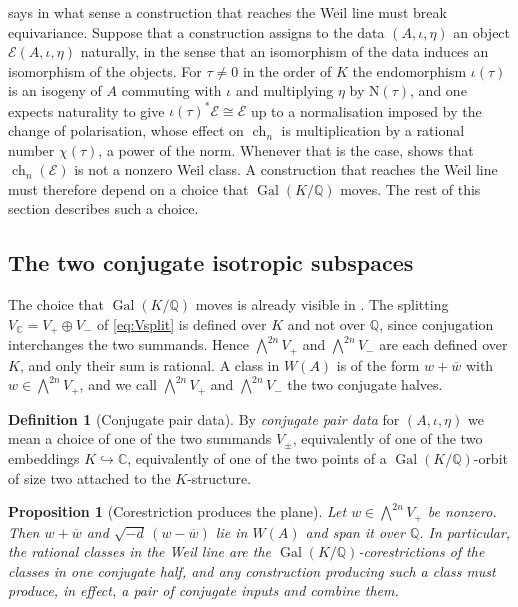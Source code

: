 \documentclass[11pt,reqno]{amsart}
\theoremstyle{plain}
\newtheorem{proposition}[theorem]{Proposition}
\theoremstyle{definition}
\newtheorem{definition}[theorem]{Definition}
\theoremstyle{remark}
\newcommand{\QQ}{\mathbb{Q}}
\newcommand{\CC}{\mathbb{C}}
\newcommand{\cE}{\mathcal{E}}
\newcommand{\HW}{W}                      %
\newcommand{\Nm}{\mathrm{N}}             %
\DeclareMathOperator{\ch}{ch}
\DeclareMathOperator{\Gal}{Gal}
\newcommand{\bbar}[1]{\overline{#1}}
\begin{document}
 says in what sense a construction that reaches the
Weil line must break equivariance. Suppose that a construction assigns to the data
$(A,\iota,\eta)$ an object $\cE(A,\iota,\eta)$ naturally, in the sense that
an isomorphism of the data induces an isomorphism of the objects. For
$\tau\ne0$ in the order of $K$ the endomorphism $\iota(\tau)$ is an isogeny of
$A$ commuting with $\iota$ and multiplying $\eta$ by $\Nm(\tau)$, and one
expects naturality to give $\iota(\tau)^{*}\cE\cong\cE$ up to a
normalisation imposed by the change of polarisation, whose effect on
$\ch_{n}$ is multiplication by a rational number $\chi(\tau)$, a power of the
norm. Whenever that is the case,  shows that
$\ch_{n}(\cE)$ is not a nonzero Weil class. A construction that reaches the
Weil line must therefore depend on a choice that $\Gal(K/\QQ)$ moves. The rest
of this section describes such a choice.

\subsection{The two conjugate isotropic subspaces}

The choice that $\Gal(K/\QQ)$ moves is already visible in
. The splitting
$V_{\CC}=V_{+}\oplus V_{-}$ of \eqref{eq:Vsplit} is defined over $K$ and not
over $\QQ$, since conjugation interchanges the two summands. Hence
$\bigwedge^{2n}V_{+}$ and $\bigwedge^{2n}V_{-}$ are each defined over $K$,
and only their sum is rational. A class in $\HW(A)$ is of the form
$w+\bbar{w}$ with $w\in\bigwedge^{2n}V_{+}$, and we call $\bigwedge^{2n}V_{+}$
and $\bigwedge^{2n}V_{-}$ the two conjugate halves.

\begin{definition}[Conjugate pair data]\label{def:conjpair}
By \emph{conjugate pair data} for $(A,\iota,\eta)$ we mean a choice of one of
the two summands $V_{\pm}$, equivalently of one of the two embeddings
$K\hookrightarrow\CC$, equivalently of one of the two points of a
$\Gal(K/\QQ)$-orbit of size two attached to the $K$-structure.
\end{definition}

\begin{proposition}[Corestriction produces the plane]\label{prop:corestriction}
Let $w\in\bigwedge^{2n}V_{+}$ be nonzero. Then $w+\bbar{w}$ and
$\sqrt{-d}\,(w-\bbar{w})$ lie in $\HW(A)$ and span it over $\QQ$. In
particular, the rational classes in the Weil line are the
$\Gal(K/\QQ)$-corestrictions of the classes in one conjugate half, and any
construction producing such a class must produce, in effect, a pair of
conjugate inputs and combine them.
\end{proposition}
\end{document}
